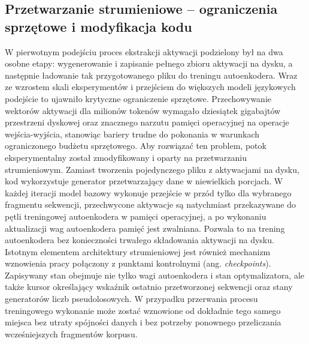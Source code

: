   \subsection{Przetwarzanie strumieniowe -- ograniczenia sprzętowe i modyfikacja kodu}
  \label{sec:przetwarzanie_strumieniowe}
  W pierwotnym podejściu proces ekstrakcji aktywacji podzielony był na dwa osobne etapy: wygenerowanie i zapisanie pełnego zbioru aktywacji na dysku, a następnie ładowanie tak przygotowanego pliku do treningu autoenkodera. Wraz ze wzrostem skali eksperymentów i przejściem do większych modeli językowych podejście to ujawniło krytyczne ograniczenie sprzętowe. Przechowywanie wektorów aktywacji dla milionów tokenów wymagało dziesiątek gigabajtów przestrzeni dyskowej oraz znacznego narzutu pamięci operacyjnej na operacje wejścia-wyjścia, stanowiąc bariery trudne do pokonania w warunkach ograniczonego budżetu sprzętowego. \newline
  Aby rozwiązać ten problem, potok eksperymentalny został zmodyfikowany i oparty na przetwarzaniu strumieniowym. Zamiast tworzenia pojedynczego pliku z aktywacjami na dysku, kod wykorzystuje generator przetwarzający dane w niewielkich porcjach. W każdej iteracji model bazowy wykonuje przejście w przód tylko dla wybranego fragmentu sekwencji, przechwycone aktywacje są natychmiast przekazywane do pętli treningowej autoenkodera w pamięci operacyjnej, a po wykonaniu aktualizacji wag autoenkodera pamięć jest zwalniana. Pozwala to na trening autoenkodera bez konieczności trwałego składowania aktywacji na dysku. \newline  
  Istotnym elementem architektury strumieniowej jest również mechanizm wznowienia pracy połączony z punktami kontrolnymi (ang. \textit{checkpoints}). Zapisywany stan obejmuje nie tylko wagi autoenkodera i stan optymalizatora, ale także kursor określający wskaźnik ostatnio przetworzonej sekwencji oraz stany generatorów liczb pseudolosowych. W przypadku przerwania procesu treningowego wykonanie może zostać wznowione od dokładnie tego samego miejsca bez utraty spójności danych i bez potrzeby ponownego przeliczania wcześniejszych fragmentów korpusu.

